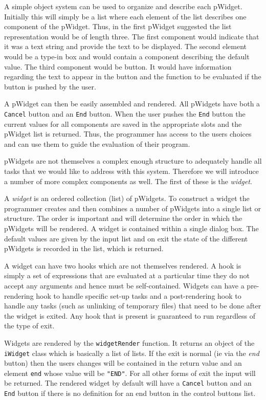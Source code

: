 \documentclass{article}
\begin{document}
A simple object system can be used to organize and describe each
pWidget.
Initially this will simply be a list where each element of the list
describes one component of the pWidget.
Thus, in the first pWidget suggested the list representation would be
of length three. The first component would indicate that it was a text
string and provide the text to be displayed. The second element would
be a type-in box and would contain a component describing the default
value. The third component would be button. It would have information
regarding the text to appear in the button and the function to be
evaluated if the button is pushed by the user.

A pWidget can then be easily assembled and rendered. 
All pWidgets have both a \verb+Cancel+ button and an \verb+End+
button. When the user pushes the \verb+End+ button the current values
for all components are saved in the appropriate slots and the pWidget
list is returned. Thus, the programmer has access to the users choices
and can use them to guide the evaluation of their program.

pWidgets are not themselves a complex enough structure to adequately
handle all tasks that we would like to address with this
system. Therefore we will introduce a number of more complex
components as well.
The first of these is the {\em widget}.

A {\em widget} is an ordered collection (list) of pWidgets.
To construct a widget the programmer creates and then combines a
number of pWidgets into a single list or structure. The order is
important and will determine the order in which the pWidgets will be
rendered.
A widget is contained within a single dialog box.
The default values are given by the input list and on exit the state
of the different pWidgets is recorded in the list, which is returned.

A widget can have two hooks which are not themselves rendered. 
A hook is simply a set of expressions that are evaluated at a
particular time they do not accept any arguments and hence must be
self-contained. 
Widgets can have a pre-rendering hook to handle specific set-up tasks
and a post-rendering hook to handle any tasks (such as unlinking of
temporary files) that need to be done after the widget is exited.
Any hook that is present is guaranteed to run regardless of the type
of exit.

Widgets are rendered by the \verb+widgetRender+ function.
It returns an object of the \verb+iWidget+ class which is basically a
list of lists. If the exit is normal (ie via the {\em end} button)
then the users changes will be contained in the return value and an
element {\tt end} whose value will be {\tt "END"}. 
For all other forms of exit the input
will be returned. The rendered widget by default will have a
\verb+Cancel+ button and an \verb+End+ button if there is no
definition for an end button in the control buttons list. 
\end{document}
